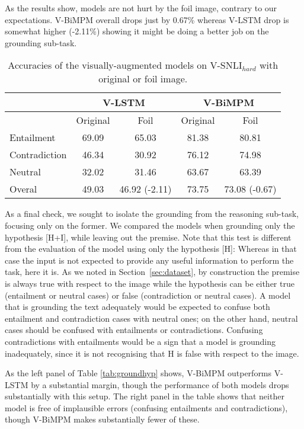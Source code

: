 \documentclass[11pt]{article}
\begin{document}
As the results show, models are not hurt by the foil image, contrary to our expectations. 
V-BiMPM overall drops just by 0.67\% whereas V-LSTM
drop is somewhat higher (-2.11\%) showing it might be doing a better
job on the grounding sub-task.

 \begin{table}
\small
\begin{center}
\begin{tabular}{|l|cc|cc|}
\hline
& \multicolumn{2}{|c|}{V-LSTM} & \multicolumn{2}{c|}{V-BiMPM}\\ \hline
 & Original & Foil & Original & Foil  \\\hline
Entailment & 69.09& 65.03  & 81.38  & 80.81    \\
Contradiction & 46.34 & 30.92 &76.12 & 74.98  \\
Neutral & 32.02 & 31.46  & 63.67 & 63.39  \\
\hline
Overal & 49.03 &  46.92 (-2.11) & 73.75 & 73.08  (-0.67) \\
\hline
\end{tabular}
\caption{Accuracies of the visually-augmented models on
  V-SNLI$_{hard}$ with original or foil image.}\label{tab:wrongimages}
\end{center}
\end{table}

As a final check, we sought to isolate the grounding from the reasoning sub-task, focusing only on the former.
We compared the models
when grounding only the hypothesis [H+I], while leaving out the premise. Note that this test is
different from the evaluation of the model using only the hypothesis
[H]: Whereas in that case the input is not expected to provide any
useful information to perform the task, here it is. As we noted in
Section~\ref{sec:dataset}, by construction the premise is always true
with respect to the image while the hypothesis can be either true
(entailment or neutral cases) or false (contradiction or neutral
cases). A model that is grounding the text adequately would be expected to
confuse both entailment and contradiction cases with neutral ones; on the other hand, neutral cases
should be confused with entailments or contradictions. Confusing contradictions with entailments would be a sign that a
model is grounding inadequately, since it is not recognising that H is false with respect to the image.

As the left panel of Table \ref{tab:groundhyp} shows, V-BiMPM outperforms V-LSTM by a substantial margin, though the performance of both models drops substantially with this setup. The right panel in the table shows that neither model is free of implausible errors (confusing entailments and contradictions), though V-BiMPM makes substantially fewer of these. 
\end{document}
